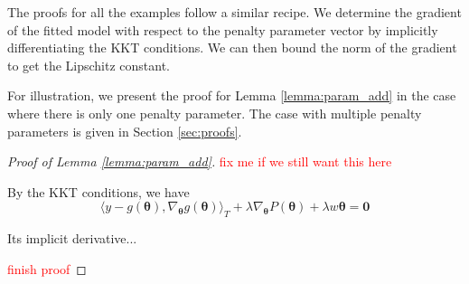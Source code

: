 \documentclass[12pt]{article}
\begin{document}
The proofs for all the examples follow a similar recipe. We determine the gradient of the fitted model with respect to the penalty parameter vector by implicitly differentiating the KKT conditions. We can then bound the norm of the gradient to get the Lipschitz constant.


For illustration, we present the proof for Lemma \ref{lemma:param_add} in the case where there is only one penalty parameter. The case with multiple penalty parameters is given in Section \ref{sec:proofs}.

\begin{proof}[Proof of Lemma \ref{lemma:param_add}]
	\textcolor{red}{fix me if we still want this here}
	
	By the KKT conditions, we have
	\[
	\langle y-g\left( \boldsymbol{\theta} \right ),\nabla_{\boldsymbol{\theta}} g\left( \boldsymbol{\theta} \right ) \rangle_{T}
	+ \lambda \nabla_{\boldsymbol{\theta}} P(\boldsymbol{\theta})
	+\lambda w \boldsymbol{\theta} =\boldsymbol{0}
	\]
	
	
	Its implicit derivative...
	
%	
\textcolor{red}{finish proof}
\end{proof}
\end{document}
